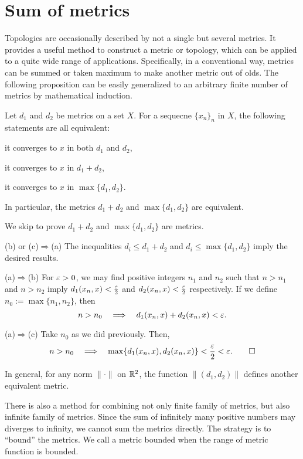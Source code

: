 \documentclass{../note}
\begin{document}
\section{Sum of metrics}
Topologies are occasionally described by not a single but several metrics.
It provides a useful method to construct a metric or topology, which can be applied to a quite wide range of applications.
Specifically, in a conventional way, metrics can be summed or taken maximum to make another metric out of olds.
The following proposition can be easily generalized to an arbitrary finite number of metrics by mathematical induction.

\begin{prop}
Let $d_1$ and $d_2$ be metrics on a set $X$.
For a sequecne $\{x_n\}_n$ in $X$, the following statements are all equivalent:
\begin{parts}
\item it converges to $x$ in both $d_1$ and $d_2$,
\item it converges to $x$ in $d_1+d_2$,
\item it converges to $x$ in $\max\{d_1,d_2\}$.
\end{parts}
In particular, the metrics $d_1+d_2$ and $\max\{d_1,d_2\}$ are equivalent.
\end{prop}
\begin{pf}
We skip to prove $d_1+d_2$ and $\max\{d_1,d_2\}$ are metrics.

(b) or (c)$\Rightarrow$(a)
The inequalities $d_i\le d_1+d_2$ and $d_i\le\max\{d_1,d_2\}$ imply the desired results.

(a)$\Rightarrow$(b)
For $\varepsilon>0$, we may find positive integers $n_1$ and $n_2$ such that $n>n_1$ and $n>n_2$ imply $d_1(x_n,x)<\frac{\varepsilon}2$ and $d_2(x_n,x)<\frac{\varepsilon}2$ respectively.
If we define $n_0:=\max\{n_1,n_2\}$, then
\[n>n_0\impl d_1(x_n,x)+d_2(x_n,x)<\e.\]

(a)$\Rightarrow$(c)
Take $n_0$ as we did previously.
Then,
\[n>n_0\impl\max\{d_1(x_n,x),d_2(x_n,x)\}<\frac\e2<\e.\qedhere\]
\end{pf}

\begin{rmk}
In general, for any norm $\|\cdot\|$ on $\mathbb{R}^2$, the function $\|(d_1,d_2)\|$ defines another equivalent metric.
\end{rmk}

There is also a method for combining not only finite family of metrics, but also infinite family of metrics.
Since the sum of infinitely many positive numbers may diverges to infinity, we cannot sum the metrics directly.
The strategy is to ``bound'' the metrics.
We call a metric bounded when the range of metric function is bounded.
\end{document}
